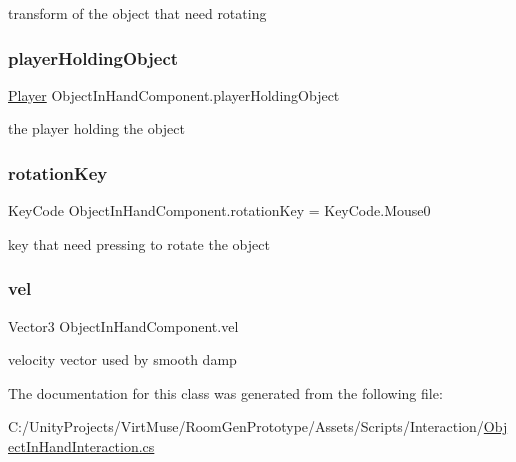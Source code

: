transform of the object that need rotating 

\mbox{\label{class_object_in_hand_component_add0e2bed573b54275914fc48c37b958c}} 
\subsubsection{\texorpdfstring{player\+Holding\+Object}{playerHoldingObject}}
{\footnotesize\ttfamily \mbox{\hyperlink{class_player}{Player}} Object\+In\+Hand\+Component.\+player\+Holding\+Object\hspace{0.3cm}{\ttfamily [private]}}



the player holding the object 

\mbox{\label{class_object_in_hand_component_aa84650b4fd81b0c4aa0bc91d2a371625}} 
\subsubsection{\texorpdfstring{rotation\+Key}{rotationKey}}
{\footnotesize\ttfamily Key\+Code Object\+In\+Hand\+Component.\+rotation\+Key = Key\+Code.\+Mouse0\hspace{0.3cm}{\ttfamily [private]}}



key that need pressing to rotate the object 

\mbox{\label{class_object_in_hand_component_abbcf3780d099790d8d2e799ab4447ec6}} 
\subsubsection{\texorpdfstring{vel}{vel}}
{\footnotesize\ttfamily Vector3 Object\+In\+Hand\+Component.\+vel\hspace{0.3cm}{\ttfamily [private]}}



velocity vector used by smooth damp 



The documentation for this class was generated from the following file\+:\begin{DoxyCompactItemize}
\item 
C\+:/\+Unity\+Projects/\+Virt\+Muse/\+Room\+Gen\+Prototype/\+Assets/\+Scripts/\+Interaction/\mbox{\hyperlink{_object_in_hand_interaction_8cs}{Object\+In\+Hand\+Interaction.\+cs}}\end{DoxyCompactItemize}
